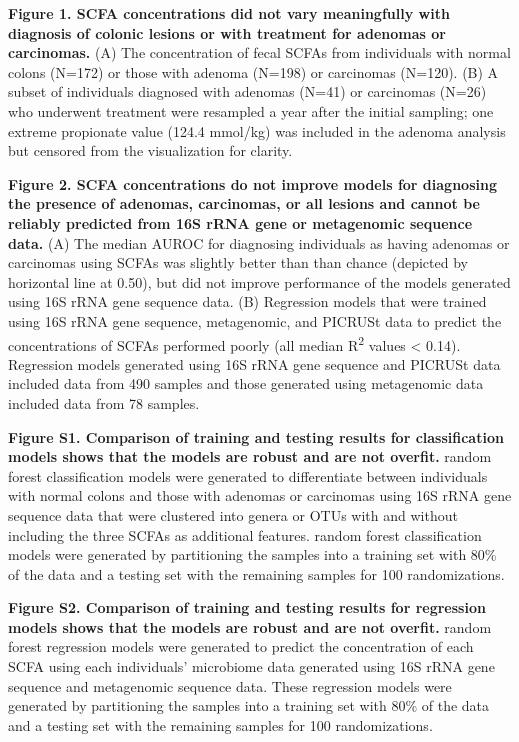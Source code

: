 \documentclass[11pt,]{article}
\begin{document}
\newpage

\textbf{Figure 1. SCFA concentrations did not vary meaningfully with
diagnosis of colonic lesions or with treatment for adenomas or
carcinomas.} (A) The concentration of fecal SCFAs from individuals with
normal colons (N=172) or those with adenoma (N=198) or carcinomas
(N=120). (B) A subset of individuals diagnosed with adenomas (N=41) or
carcinomas (N=26) who underwent treatment were resampled a year after
the initial sampling; one extreme propionate value (124.4 mmol/kg) was
included in the adenoma analysis but censored from the visualization for
clarity.

\textbf{Figure 2. SCFA concentrations do not improve models for
diagnosing the presence of adenomas, carcinomas, or all lesions and
cannot be reliably predicted from 16S rRNA gene or metagenomic sequence
data.} (A) The median AUROC for diagnosing individuals as having
adenomas or carcinomas using SCFAs was slightly better than than chance
(depicted by horizontal line at 0.50), but did not improve performance
of the models generated using 16S rRNA gene sequence data. (B)
Regression models that were trained using 16S rRNA gene sequence,
metagenomic, and PICRUSt data to predict the concentrations of SCFAs
performed poorly (all median R\textsuperscript{2} values \textless{}
0.14). Regression models generated using 16S rRNA gene sequence and
PICRUSt data included data from 490 samples and those generated using
metagenomic data included data from 78 samples.

\textbf{Figure S1. Comparison of training and testing results for
classification models shows that the models are robust and are not
overfit.} random forest classification models were generated to
differentiate between individuals with normal colons and those with
adenomas or carcinomas using 16S rRNA gene sequence data that were
clustered into genera or OTUs with and without including the three SCFAs
as additional features. random forest classification models were
generated by partitioning the samples into a training set with 80\% of
the data and a testing set with the remaining samples for 100
randomizations.

\textbf{Figure S2. Comparison of training and testing results for
regression models shows that the models are robust and are not overfit.}
random forest regression models were generated to predict the
concentration of each SCFA using each individuals' microbiome data
generated using 16S rRNA gene sequence and metagenomic sequence data.
These regression models were generated by partitioning the samples into
a training set with 80\% of the data and a testing set with the
remaining samples for 100 randomizations.
\end{document}
